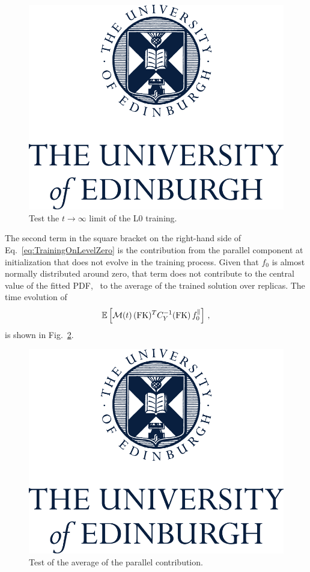 \begin{figure}[h!]
  \centering
  \includegraphics[scale=0.5]{plots/UoECentredLogo282v1160215.png}  
  \caption{Test the $t\to\infty$ limit of the L0 training.}
  \label{fig:InfiniteTimeVterm}
\end{figure}

The second term in the square bracket on the right-hand side of 
Eq.~\eqref{eq:TrainingOnLevelZero}
is the contribution from the parallel component at initialization that does not evolve
in the training process. Given that $f_0$ is almost normally distributed around zero, 
that term does not contribute to the central value of the fitted PDF, \ie\ to the average
of the trained solution over replicas. The time evolution of 
\begin{align}
  \label{eq:AverageLevelZeroUcheck}
  \mathbb{E}\left[\mathcal{M}(t)\, (\mathrm{FK})^T C_{Y}^{-1} (\mathrm{FK})\, 
    f_{0}^\parallel\right]\, ,
\end{align}
is shown in Fig.~\ref{fig:AverageLevelZeroUcheck}.
\begin{figure}[h!]
  \centering
  \includegraphics[scale=0.5]{plots/UoECentredLogo282v1160215.png}  
  \caption{Test of the average of the parallel contribution.}
  \label{fig:AverageLevelZeroUcheck}
\end{figure}

